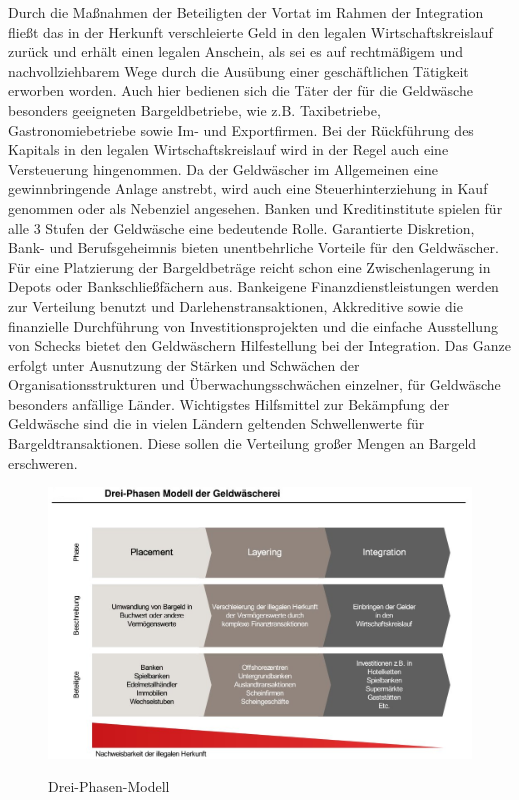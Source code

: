 \documentclass{article}
\begin{document}
\begin{enumerate}
                        Durch die Maßnahmen der Beteiligten der Vortat im Rahmen der Integration fließt das in der Herkunft verschleierte Geld in den legalen Wirtschaftskreislauf zurück und erhält einen legalen Anschein, als sei es auf rechtmäßigem und nachvollziehbarem Wege durch die Ausübung einer geschäftlichen Tätigkeit erworben worden. Auch hier bedienen sich die Täter der für die Geldwäsche besonders geeigneten Bargeldbetriebe, wie z.B. Taxibetriebe, Gastronomiebetriebe sowie Im- und Exportfirmen.
                        Bei der Rückführung des Kapitals in den legalen Wirtschaftskreislauf wird in der Regel auch eine Versteuerung hingenommen. Da der Geldwäscher im Allgemeinen eine gewinnbringende Anlage anstrebt, wird auch eine Steuerhinterziehung in Kauf genommen oder als Nebenziel angesehen.
                        Banken und Kreditinstitute spielen für alle 3 Stufen der Geldwäsche eine bedeutende Rolle. Garantierte Diskretion, Bank- und Berufsgeheimnis bieten unentbehrliche Vorteile für den Geldwäscher. Für eine Platzierung der Bargeldbeträge reicht schon eine Zwischenlagerung in Depots oder Bankschließfächern aus. Bankeigene Finanzdienstleistungen werden zur Verteilung benutzt und Darlehenstransaktionen, Akkreditive sowie die finanzielle Durchführung von Investitionsprojekten und die einfache Ausstellung von Schecks bietet den Geldwäschern Hilfestellung bei der Integration. Das Ganze erfolgt unter Ausnutzung der Stärken und Schwächen der Organisationsstrukturen und Überwachungsschwächen einzelner, für Geldwäsche besonders anfällige Länder.
                        Wichtigstes Hilfsmittel zur Bekämpfung der Geldwäsche sind die in vielen Ländern geltenden Schwellenwerte für Bargeldtransaktionen. Diese sollen die Verteilung großer Mengen an Bargeld erschweren.

                \end{enumerate}
               
                \begin{figure}
                    \centering
                        \includegraphics[scale=0.3]{../../turandon/data/drei_phasen_modell.png}
                            \caption{Drei-Phasen-Modell}
                    \label{fig2}
                        \cite{Abb1}
                \end{figure}
\end{document}

